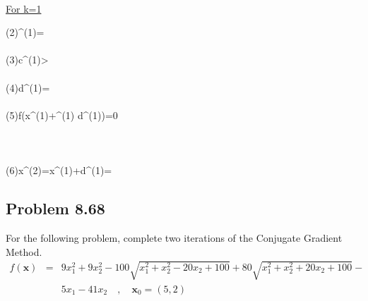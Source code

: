 \documentclass[]{report}
\begin{document}
\\
\underline{For k=1}
\begin{program}
\left(2\right)\quad {}^{(1)}=\left[38.8\ , \ -17.5\right]\\~  \\
\left(3\right)\quad \lvert \mathbf c^{(1)}>\epsilon\\~  \\
\left(4\right)\quad \mathbf d^{(1)}=\left[-38.8\ , \ 17.5\right]\\~  \\
\left(5\right)\quad \delta f\left(\mathbf x^{(1)}+\alpha^{(1)} \mathbf d^{(1)}\right)=0\\~  \\
\quad \quad \quad \quad \quad \quad \quad \quad \quad {}\\~\\
\left(6\right)\quad \mathbf x^{(2)}=\mathbf x^{(1)}+\mathbf d^{(1)}=\left[0.063\ , \ -7.9\right]
\end{program}
\subsection*{Problem 8.68}
For the following problem, complete two iterations of the Conjugate Gradient Method.
\begin{eqnarray*}
f\left(\mathbf x\right)&=&9x_1^2+9x_2^2-100\sqrt{x_1^2+x_2^2-20x_2+100}+80\sqrt{x_1^2+x_2^2+20x_2+100}-\\&&5x_1-41x_2 \quad,\quad \mathbf{x}_0=\left(5,2\right)
\end{eqnarray*}
\end{document}
